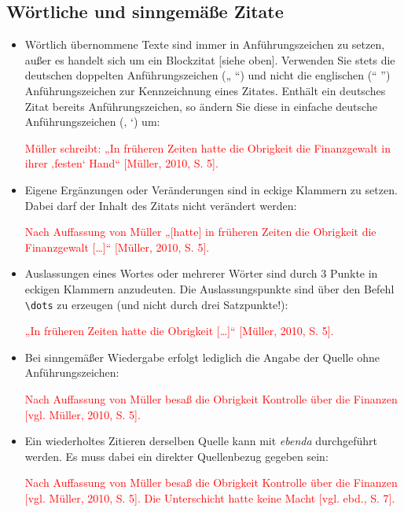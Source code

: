 \subsection{Wörtliche und sinngemäße Zitate}
\begin{itemize}
	\item	Wörtlich übernommene Texte sind immer in Anführungszeichen zu setzen, außer es handelt sich um ein Blockzitat [siehe oben]. Verwenden Sie stets die deutschen doppelten Anführungszeichen („ “) und nicht die englischen (“ ”) Anführungszeichen zur Kennzeichnung eines Zitates. Enthält ein deutsches Zitat bereits Anführungszeichen, so ändern Sie diese in einfache deutsche Anführungszeichen (‚  ‘) um:
	\begin{addmargin}[10pt]{0pt}
		\textcolor{red}{Müller schreibt: „In früheren Zeiten hatte die Obrigkeit die Finanzgewalt in ihrer ‚festen‘ Hand“ [Müller, 2010, S. 5].}
	\end{addmargin}
	\item	Eigene Ergänzungen oder Veränderungen sind in eckige Klammern zu setzen. Dabei darf der Inhalt des Zitats nicht verändert werden:
	\begin{addmargin}[10pt]{0pt}
		\textcolor{red}{Nach Auffassung von Müller „[hatte] in früheren Zeiten die Obrigkeit die Finanzgewalt [\dots]“ [Müller, 2010, S. 5].}
	\end{addmargin}
	\item	Auslassungen eines Wortes oder mehrerer Wörter sind durch 3 Punkte in eckigen Klammern anzudeuten. Die Auslassungspunkte sind über den Befehl \verb|\dots| zu erzeugen (und nicht durch drei Satzpunkte!):
	\begin{addmargin}[10pt]{0pt}
		\textcolor{red}{„In früheren Zeiten hatte die Obrigkeit […]“ [Müller, 2010, S. 5].}
	\end{addmargin}
	\item	Bei sinngemäßer Wiedergabe erfolgt lediglich die Angabe der Quelle ohne Anführungszeichen:
	\begin{addmargin}[10pt]{0pt}
		\textcolor{red}{Nach Auffassung von Müller besaß die Obrigkeit Kontrolle über die Finanzen [vgl. Müller, 2010, S. 5].}
	\end{addmargin}
	\item	Ein wiederholtes Zitieren derselben Quelle kann mit \textsl{ebenda} durchgeführt werden. Es muss dabei ein direkter Quellenbezug gegeben sein:
	\begin{addmargin}[10pt]{0pt}
		\textcolor{red}{Nach Auffassung von Müller besaß die Obrigkeit Kontrolle über die Finanzen [vgl. Müller, 2010, S. 5]. Die Unterschicht hatte keine Macht  [vgl. ebd., S. 7].}
	\end{addmargin}
\end{itemize}

